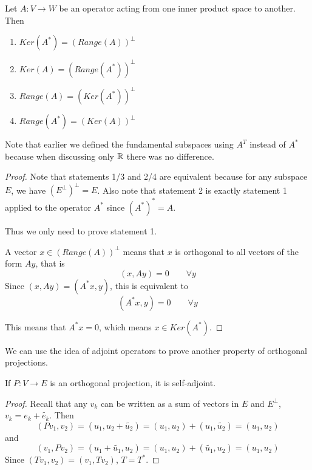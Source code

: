 \begin{theorem}
Let $A: V \rightarrow W$ be an operator acting from one inner product space to another. Then 
\begin{enumerate}
	\item $Ker(A^{*}) = (Range(A))^{\perp}$ 
	\item $Ker(A) = (Range(A^{*}))^{\perp}$ 
	\item $Range(A) = (Ker(A^{*}))^{\perp}$ 
	\item $Range(A^{*}) = (Ker(A))^{\perp}$
\end{enumerate}

Note that earlier we defined the fundamental subspaces using $A^{T}$ instead of $A^{*}$ because when discussing only $\mathbb{R}$ there was no difference. 
\end{theorem}

\begin{proof}
Note that statements 1/3 and 2/4 are equivalent because for any subspace $E$, we have $(E^{\perp})^{\perp} = E$. Also note that statement 2 is exactly statement 1 applied to the operator $A^{*}$ since $(A^{*})^{*} = A$. 

Thus we only need to prove statement 1. 

A vector $x \in (Range(A))^{\perp}$ means that $x$ is orthogonal to all vectors of the form $Ay$, that is 
$$(x, Ay) = 0 \qquad \forall y$$ 
Since $(x, Ay) = (A^{*}x, y)$, this is equivalent to 
$$(A^{*} x, y) = 0 \qquad \forall y$$

This means that $A^{*}x = 0$, which means $x \in Ker(A^{*})$. 
\end{proof}

We can use the idea of adjoint operators to prove another property of orthogonal projections. 

\begin{theorem}
If $P: V \rightarrow E$ is an orthogonal projection, it is self-adjoint. 
\end{theorem}

\begin{proof}
Recall that any $v_{k}$ can be written as a sum of vectors in $E$ and $E^{\perp}$, $v_{k} = e_{k} + \widetilde{e_{k}}$. Then
$$(Pv_{1}, v_{2}) = (u_{1}, u_{2} + \widetilde{u_{2}}) = (u_{1}, u_{2}) + (u_{1}, \widetilde{u_{2}}) = (u_{1}, u_{2})$$
and 
$$(v_{1}, Pv_{2}) = (u_{1} + \widetilde{u_{1}}, u_{2}) = (u_{1}, u_{2}) + (\widetilde{u_{1}}, u_{2}) = (u_{1}, u_{2})$$
Since $(Tv_{1}, v_{2}) = (v_{1}, Tv_{2})$, $T = T^{*}$. 
\end{proof}

